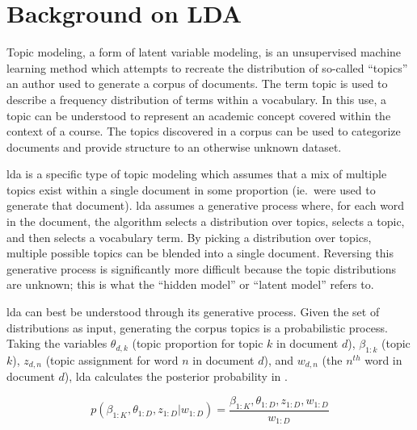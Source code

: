 \section{Background on LDA}
\label{sec:background}


Topic modeling, a form of latent variable modeling, is an unsupervised machine learning method which attempts to recreate the distribution of so-called ``topics'' an author used to generate a corpus of documents.
The term topic is used to describe a frequency distribution of terms within a vocabulary.
In this use, a topic can be understood to represent an academic concept covered within the context of a course.
The topics discovered in a corpus can be used to categorize documents and provide structure to an otherwise unknown dataset.


\acf{lda} is a specific type of topic modeling which assumes that a mix of multiple topics exist within a single document in some proportion (ie.\ were used to generate that document). \cite{Blei2003}
\ac{lda} assumes a generative process where, for each word in the document, the algorithm selects a distribution over topics, selects a topic, and then selects a vocabulary term. \cite{Blei2003}
By picking a distribution over topics, multiple possible topics can be blended into a single document.
Reversing this generative process is significantly more difficult because the topic distributions are unknown; this is what the ``hidden model'' or ``latent model'' refers to.


\ac{lda} can best be understood through its generative process.
Given the set of distributions as input, generating the corpus topics is a probabilistic process.
Taking the variables $\theta_{d,k}$ (topic proportion for topic $k$ in document $d$), $\beta_{1:k}$ (topic $k$), $z_{d,n}$ (topic assignment for word $n$ in document $d$), and $w_{d,n}$ (the $n^{th}$ word in document $d$), \ac{lda} calculates the posterior probability in . \cite{Blei2012}


\begin{equation}
p(\beta_{1:K}, \theta_{1:D},z_{1:D} | w_{1:D}) = \frac{\beta_{1:K},
\theta_{1:D},z_{1:D}, w_{1:D}}{w_{1:D}}
\label{eq:posterior}
\end{equation}

